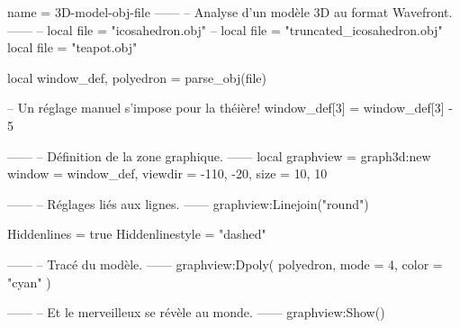 \documentclass{standalone}
\begin{document}
\begin{luadraw}{name = 3D-model-obj-file}
------
-- Analyse d'un modèle 3D au format Wavefront.
------
-- local file = "icosahedron.obj"
-- local file = "truncated_icosahedron.obj"
local file = "teapot.obj"

local window_def, polyedron = parse_obj(file)

-- Un réglage manuel s'impose pour la théière!
window_def[3] = window_def[3] - 5

------
-- Définition de la zone graphique.
------
local graphview = graph3d:new{
  window  = window_def,
  viewdir = {-110, -20},
  size    = {10, 10}
}

------
-- Réglages liés aux lignes.
------
graphview:Linejoin("round")

Hiddenlines     = true
Hiddenlinestyle = "dashed"

------
-- Tracé du modèle.
------
graphview:Dpoly(
  polyedron,
  {
    mode  = 4,
    color = "cyan"
  })

------
-- Et le merveilleux se révèle au monde.
------
graphview:Show()
\end{luadraw}
\end{document}
